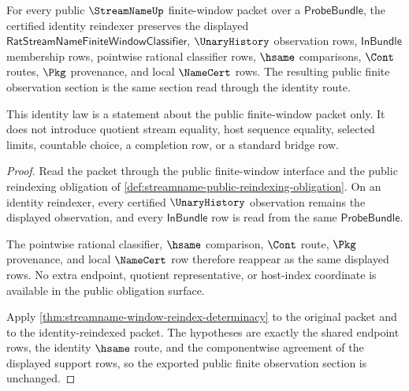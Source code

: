 \begin{theorem}
\label{thm:streamname-public-reindexing-identity-law}
For every public $\StreamNameUp$ finite-window packet over a
$\mathsf{ProbeBundle}$, the certified identity reindexer preserves the
displayed $\mathsf{RatStreamNameFiniteWindowClassifier}$, $\UnaryHistory$
observation rows, $\mathsf{InBundle}$ membership rows, pointwise rational
classifier rows, $\hsame$ comparisons, $\Cont$ routes, $\Pkg$ provenance, and
local $\NameCert$ rows. The resulting public finite observation section is the
same section read through the identity route.

This identity law is a statement about the public finite-window packet only.
It does not introduce quotient stream equality, host sequence equality,
selected limits, countable choice, a completion row, or a standard bridge row.
\end{theorem}
\begin{proof}
Read the packet through the public finite-window interface and the public
reindexing obligation of
\autoref{def:streamname-public-reindexing-obligation}. On an identity
reindexer, every certified $\UnaryHistory$ observation remains the displayed
observation, and every $\mathsf{InBundle}$ row is read from the same
$\mathsf{ProbeBundle}$.

The pointwise rational classifier, $\hsame$ comparison, $\Cont$ route,
$\Pkg$ provenance, and local $\NameCert$ row therefore reappear as the same
displayed rows. No extra endpoint, quotient representative, or host-index
coordinate is available in the public obligation surface.

Apply \autoref{thm:streamname-window-reindex-determinacy} to the original
packet and to the identity-reindexed packet. The hypotheses are exactly the
shared endpoint rows, the identity $\hsame$ route, and the componentwise
agreement of the displayed support rows, so the exported public finite
observation section is unchanged.
\end{proof}

